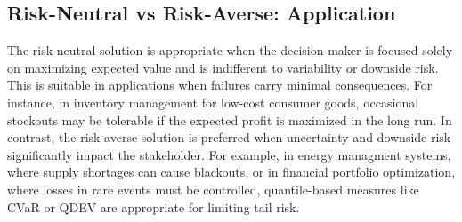 \documentclass[7pt]{article}
\begin{document}
\subsection{Risk-Neutral vs Risk-Averse: Application}

The risk-neutral solution is appropriate when the decision-maker is focused
solely on maximizing expected value and is indifferent to variability or
downside risk. This is suitable in applications when failures carry minimal
consequences. For instance, in inventory management for low-cost consumer
goods, occasional stockouts may be tolerable if the expected profit is
maximized in the long run. In contrast, the risk-averse solution is preferred
when uncertainty and downside risk significantly impact the stakeholder. For
example, in energy managment systems, where supply shortages can cause
blackouts, or in financial portfolio optimization, where losses in rare events
must be controlled, quantile-based measures like CVaR or QDEV are appropriate
for limiting tail risk.
\end{document}

